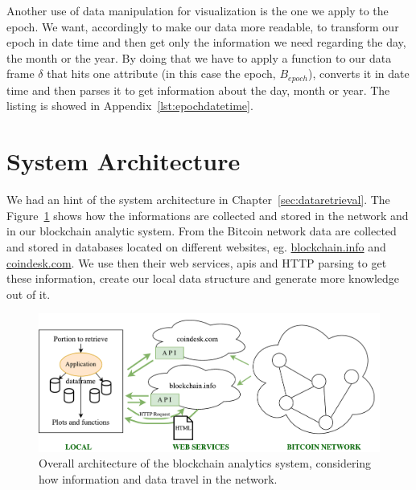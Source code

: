 \documentclass[USenglish]{uit-thesis}
\begin{document}
Another use of data manipulation for visualization is the one we apply to
the epoch. We want, accordingly to make our data more readable, to transform
our epoch in date time and then get only the information we need
regarding the day, the month or the year. By doing that we have to
apply a function to our data frame $\delta$ that hits one attribute
(in this case the epoch, $B_{epoch}$), converts it in date time
and then parses it to get information about the day, month or year.
The listing is showed in Appendix~\ref{lst:epochdatetime}.
\section{System Architecture}
\label{sec:implementation}
We had an hint of the system architecture in
Chapter~\ref{sec:dataretrieval}.
The Figure~\ref{fig:architecture} shows how
the informations are collected and stored in the
network and in our blockchain analytic system.
From the Bitcoin network data are collected and
stored in databases located on different
websites, eg. \url{blockchain.info} and \url{coindesk.com}.
We use then their web services, \gls{api}s and
HTTP parsing to get these information,
create our local data structure and generate
more knowledge out of it.
\begin{figure}[h]
	\centering
	\includegraphics[width=1\textwidth]{img/architecture}
	\caption{Overall architecture of the blockchain analytics system, considering how information
	and data travel in the network.}
	\label{fig:architecture}
\end{figure}
\end{document}
